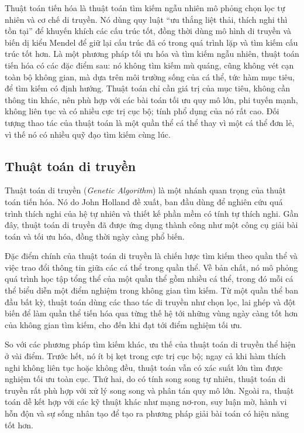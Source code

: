 \documentclass[11pt]{article}
\begin{document}
Thuật toán tiến hóa là thuật toán tìm kiếm ngẫu nhiên mô phỏng chọn lọc tự
nhiên và cơ chế di truyền. Nó dùng quy luật ``ưu thắng liệt thải, thích nghi
thì tồn tại'' để khuyến khích các cấu trúc tốt, đồng thời dùng mô hình di
truyền và biến dị kiểu Mendel để giữ lại cấu trúc đã có trong quá trình lặp và
tìm kiếm cấu trúc tốt hơn. Là một phương pháp tối ưu hóa và tìm kiếm ngẫu
nhiên, thuật toán tiến hóa có các đặc điểm sau: nó không tìm kiếm mù quáng,
cũng không vét cạn toàn bộ không gian, mà dựa trên môi trường sống của cá thể,
tức hàm mục tiêu, để tìm kiếm có định hướng. Thuật toán chỉ cần giá trị của
mục tiêu, không cần thông tin khác, nên phù hợp với các bài toán tối ưu quy mô
lớn, phi tuyến mạnh, không liên tục và có nhiều cực trị cục bộ; tính phổ dụng
của nó rất cao. Đối tượng thao tác của thuật toán là một quần thể cá thể thay
vì một cá thể đơn lẻ, vì thế nó có nhiều quỹ đạo tìm kiếm cùng lúc.

\subsection{Thuật toán di truyền}

Thuật toán di truyền (\emph{Genetic Algorithm}) là một nhánh quan trọng của
thuật toán tiến hóa. Nó do John Holland đề xuất, ban đầu dùng để nghiên cứu
quá trình thích nghi của hệ tự nhiên và thiết kế phần mềm có tính tự thích
nghi. Gần đây, thuật toán di truyền đã được ứng dụng thành công như một công
cụ giải bài toán và tối ưu hóa, đồng thời ngày càng phổ biến.

Đặc điểm chính của thuật toán di truyền là chiến lược tìm kiếm theo quần thể
và việc trao đổi thông tin giữa các cá thể trong quần thể. Về bản chất, nó mô
phỏng quá trình học tập tổng thể của một quần thể gồm nhiều cá thể, trong đó
mỗi cá thể biểu diễn một điểm nghiệm trong không gian tìm kiếm. Từ một quần
thể ban đầu bất kỳ, thuật toán dùng các thao tác di truyền như chọn lọc, lai
ghép và đột biến để làm quần thể tiến hóa qua từng thế hệ tới những vùng ngày
càng tốt hơn của không gian tìm kiếm, cho đến khi đạt tới điểm nghiệm tối ưu.

So với các phương pháp tìm kiếm khác, ưu thế của thuật toán di truyền thể hiện
ở vài điểm. Trước hết, nó ít bị kẹt trong cực trị cục bộ; ngay cả khi hàm thích
nghi không liên tục hoặc không đều, thuật toán vẫn có xác suất lớn tìm được
nghiệm tối ưu toàn cục. Thứ hai, do có tính song song tự nhiên, thuật toán di
truyền rất phù hợp với xử lý song song và phân tán quy mô lớn. Ngoài ra, thuật
toán dễ kết hợp với các kỹ thuật khác như mạng nơ-ron, suy luận mờ, hành vi
hỗn độn và sự sống nhân tạo để tạo ra phương pháp giải bài toán có hiệu năng
tốt hơn.
\end{document}
